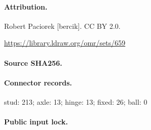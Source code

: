 \paragraph{Attribution.}Robert Paciorek [bercik]. CC BY 2.0.\par\url{https://library.ldraw.org/omr/sets/659}
\paragraph{Source SHA256.}
\paragraph{Connector records.}stud: 213; axle: 13; hinge: 13; fixed: 26; ball: 0
\paragraph{Public input lock.}
